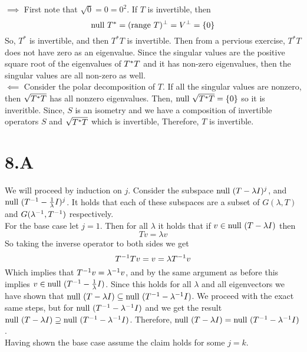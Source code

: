 \documentclass[10pt, twocolumn]{article}
\begin{document}
\begin{q}[13]
    $ \implies $
    First note that $ \sqrt{0} = 0 = 0^2 $.
    If $ T $ is invertible, then $$ \text{null } T^* = (\text{range } T)^\perp = V^\perp = \{0\} $$
    So, $ T^* $ is invertible, and then $ T^*T $ is invertible.  
    Then from a pervious exercise, $ T^* T $ does not have zero as an eigenvalue.
    Since the singular values are the positive square root of the eigenvalues of $ T^* T $ and it has non-zero eigenvalues, 
    then the singular values are all non-zero as well. \\
    $ \impliedby $ Consider the polar decomposition of $ T $. 
    If all the singular values are nonzero, then $ \sqrt{T^* T} $ has all nonzero eigenvalues.
    Then, $ \text{null } \sqrt{T^* T} = \{0\} $ so it is inveritble. 
    Since, $ S $ is an isometry and we have a composition of invertible operators $ S $ and $ \sqrt{T^* T} $ which is invertible, 
    Therefore, $ T $ is invertible.
\end{q}

\pagebreak
\section{8.A}

\begin{q}[3]
    We will proceed by induction on $ j $. 
    Consider the subspace $ \text{null } (T - \lambda I)^j $, 
    and $ \text{null } (T^{-1} - \frac{1}{\lambda} I)^j $. 
    It holds that each of these subspaces are a subset of 
    $ G(\lambda, T) $ and $ G(\lambda^{-1}, T^{-1}) $ respectively. \\
    For the base case let $ j = 1 $.
    Then for all $ \lambda $ it holds that if 
    $ v \in \text{null } (T - \lambda I) $ then 
    $$ Tv = \lambda v $$
    So taking the inverse operator to both sides we get
    $$ T^{-1}Tv = v = \lambda T^{-1} v $$
    Which implies that 
    $ T^{-1}v = \lambda^{-1} v $, 
    and by the same argument as before this implies $ v \in \text{null } (T^{-1} - \frac{1}{\lambda} I) $. 
    Since this holds for all $ \lambda $ 
    and all eigenvectors we have shown that 
    $ \text{null } (T - \lambda I) \subseteq \text{null } (T^{-1} - \lambda^{-1} I) $. 
    We proceed with the exact same steps, but for $\text{null } (T^{-1} - \lambda^{-1} I) $ and we get the result
    $ \text{null } (T - \lambda I) \supseteq \text{null } (T^{-1} - \lambda^{-1} I) $. 
    Therefore, 
    $ \text{null } (T - \lambda I) = \text{null } (T^{-1} - \lambda^{-1} I) $. \\
    Having shown the base case assume the claim holds for some $ j = k $.
\end{q}
\end{document}
